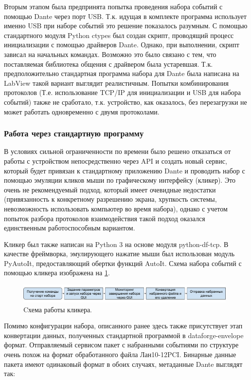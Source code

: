 \documentclass[a4paper,14pt]{extreport}
\begin{document}
Вторым этапом была предпринята попытка проведения набора событий с помощью Dante через порт USB. Т.к. идущая в комплекте программа использует именно USB при наборе событий это решение показалось разумным. С помощью стандартного модуля Python ctypes был создан скрипт, проводящий процесс инициализации с помощью драйверов Dante. Однако, при выполнении, скрипт зависал на начальных командах. Возможно это было связано с тем, что поставляемая библиотека общения с драйвером была устаревшая. Т.к. предположительно стандартная программа набора для Dante была написана на LabView такой вариант выглядит реалистичным. Попытки комбинирования протоколов (Т.е. использование TCP/IP для инициализации и USB для набора событий) также не сработало, т.к. устройство, как оказалось, без перезагрузки не может работать одновременно с двумя протоколами.

\subsubsection{Работа через стандартную программу}

В условиях сильной ограниченности по времени было решено отказаться от работы с устройством непосредственно через API и создать новый сервис, который будет привязан к стандартному приложению Dante и проводить набор с помощью эмуляции кликов мыши по графическому интерфейсу (кликер). Это очень не рекомендуемый подход, который имеет очевидные недостатки (привязанность к конкретному разрешению экрана, хрупкость системы, невозможность использовать компьютер во время набора), однако с учетом попыток разбора протоколов взаимодействия такой подход оказался единственным работоспособным вариантом.

Кликер был также написан на Python 3 на основе модуля python-df-tcp. В качестве фреймворка, эмулирующего нажатие мыши был использован модуль PyAutoIt, предоставляющий обертки функций AutoIt\cite{autoit}. Схема набора событий с помощью кликера изображена на \ref{fig:clicker-workflow}.

\begin{figure}
  \centering
  \includegraphics[width = 0.98\textwidth]{img/dante/clicker-workflow.pdf}
    \caption{Cхема работы кликера.}
    \label{fig:clicker-workflow}
\end{figure}

Помимо конфигурации набора, описанного ранее здесь также присутствует этап конвертации данных, полученных стандартной программой в dataforge-envelope формат. Отправляемый сервисом пакет с набранными событиями по структуре очень похож на формат обработанного файла Лан10-12PCI. Бинарные данные пакета имеют одинаковый формат в обоих случаях, метаданные Dante выглядят так:
\end{document}
